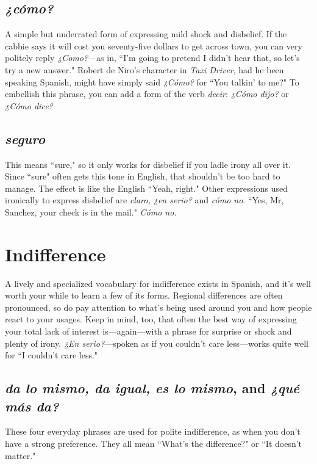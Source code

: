 \subsection{\emph{¿cómo?}}

A simple but underrated form of expressing mild shock and
disbelief. If the cabbie says it will cost you seventy-five dollars to get
across town, you can very politely reply \emph{¿Como?}---as in, ``I'm going to
pretend I didn't hear that, so let's try a new answer." Robert de Niro's
character in \emph{Taxi Driver}, had he been speaking Spanish, might have
simply said \emph{¿Cómo?} for ``You talkin' to me?" To embellish this phrase,
you can add a form of the verb \emph{decir}: \emph{¿Cómo dijo?} or \emph{¿Cómo dice?}

\subsection{\emph{seguro}}

This means ``sure," so it only works for disbelief if you ladle
irony all over it. Since ``sure" often gets this tone in English, that
shouldn't be too hard to manage. The effect is like the English ``Yeah,
right." Other expressions used ironically to express disbelief are \emph{claro,
¿en serio?} and \emph{cómo no}. ``Yes, Mr, Sanchez, your check is in the mail."
\emph{Cómo no}.

\section{Indifference}

A lively and specialized vocabulary for indifference exists in
Spanish, and it's well worth your while to learn a few of its forms. Regional differences are often pronounced, so do pay attention to what's
being used around you and how people react to your usages. Keep in
mind, too, that often the best way of expressing your total lack of interest is---again---with a phrase for surprise or shock and plenty of
irony. \emph{¿En serio?}---spoken as if you couldn't care less---works quite
well for ``I couldn't care less."

\subsection{\emph{da lo mismo, da igual, es lo mismo}, and \emph{¿qué más da?}}

These four everyday phrases are used for polite indifference, as
when you don't have a strong preference. They all mean ``What's the
difference?" or ``It doesn't matter."

